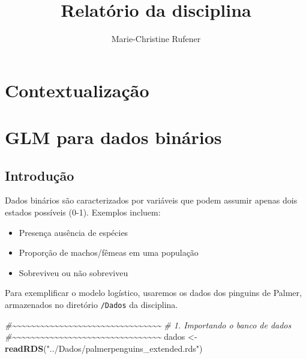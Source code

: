 \documentclass[
]{book}
\title{Relatório da disciplina}
\author{Marie-Christine Rufener}
\date{}
\newenvironment{Shaded}{\begin{snugshade}}{\end{snugshade}}
\newcommand{\CommentTok}[1]{\textcolor[rgb]{0.56,0.35,0.01}{\textit{#1}}}
\newcommand{\FunctionTok}[1]{\textcolor[rgb]{0.13,0.29,0.53}{\textbf{#1}}}
\newcommand{\NormalTok}[1]{#1}
\newcommand{\OtherTok}[1]{\textcolor[rgb]{0.56,0.35,0.01}{#1}}
\newcommand{\StringTok}[1]{\textcolor[rgb]{0.31,0.60,0.02}{#1}}
\providecommand{\tightlist}{%
  \setlength{\itemsep}{0pt}\setlength{\parskip}{0pt}}
\begin{document}
\maketitle

{
\setcounter{tocdepth}{1}
\tableofcontents
}
\chapter{Contextualização}\label{contextualizauxe7uxe3o}

\chapter{GLM para dados binários}\label{glm-para-dados-binuxe1rios}

\section{Introdução}\label{introduuxe7uxe3o}

Dados binários são caracterizados por variáveis que podem assumir apenas dois estados possíveis (0-1). Exemplos incluem:

\begin{itemize}
\tightlist
\item
  Presença ausência de espécies
\item
  Proporção de machos/fêmeas em uma população
\item
  Sobreviveu ou não sobreviveu
\end{itemize}

Para exemplificar o modelo logístico, usaremos os dados dos pinguins de Palmer, armazenados no diretório \texttt{/Dados} da disciplina.

\begin{Shaded}
\begin{Highlighting}[]
\CommentTok{\#\textasciitilde{}\textasciitilde{}\textasciitilde{}\textasciitilde{}\textasciitilde{}\textasciitilde{}\textasciitilde{}\textasciitilde{}\textasciitilde{}\textasciitilde{}\textasciitilde{}\textasciitilde{}\textasciitilde{}\textasciitilde{}\textasciitilde{}\textasciitilde{}\textasciitilde{}\textasciitilde{}\textasciitilde{}\textasciitilde{}\textasciitilde{}\textasciitilde{}\textasciitilde{}\textasciitilde{}\textasciitilde{}\textasciitilde{}\textasciitilde{}\textasciitilde{}\textasciitilde{}\textasciitilde{}\textasciitilde{}\textasciitilde{}}
\CommentTok{\# 1. Importando o banco de dados}
\CommentTok{\#\textasciitilde{}\textasciitilde{}\textasciitilde{}\textasciitilde{}\textasciitilde{}\textasciitilde{}\textasciitilde{}\textasciitilde{}\textasciitilde{}\textasciitilde{}\textasciitilde{}\textasciitilde{}\textasciitilde{}\textasciitilde{}\textasciitilde{}\textasciitilde{}\textasciitilde{}\textasciitilde{}\textasciitilde{}\textasciitilde{}\textasciitilde{}\textasciitilde{}\textasciitilde{}\textasciitilde{}\textasciitilde{}\textasciitilde{}\textasciitilde{}\textasciitilde{}\textasciitilde{}\textasciitilde{}\textasciitilde{}\textasciitilde{}}
\NormalTok{dados }\OtherTok{\textless{}{-}} \FunctionTok{readRDS}\NormalTok{(}\StringTok{"../Dados/palmerpenguins\_extended.rds"}\NormalTok{)}
\end{Highlighting}
\end{Shaded}
\end{document}

